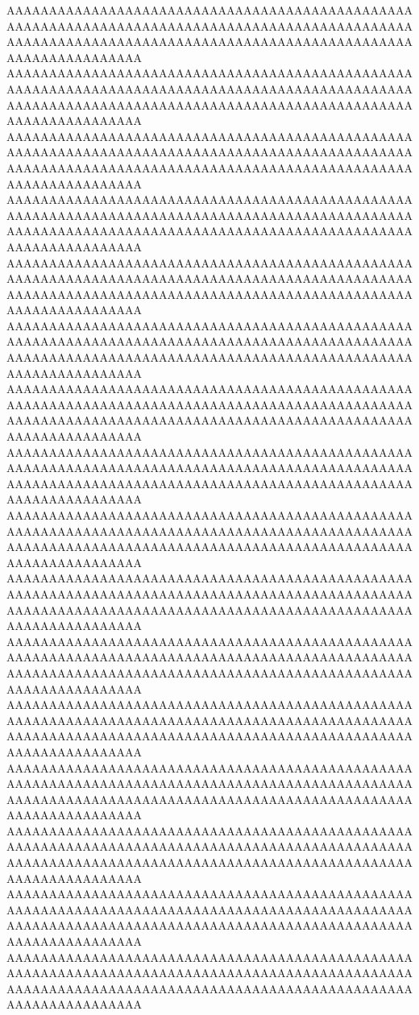 \documentclass[multi=frame]{standalone}
\begin{document}
\begin{world}
        AAAAAAAAAAAAAAAAAAAAAAAAAAAAAAAAAAAAAAAAAAAAAAAAAAAAAAAAAAAAAAAAAAAAAAAAAAAAAAAAAAAAAAAAAAAAAAAAAAAAAAAAAAAAAAAAAAAAAAAAAAAAAAAAAAAAAAAAAAAAAAAAAAAAAAAAAAAAAAAA
        AAAAAAAAAAAAAAAAAAAAAAAAAAAAAAAAAAAAAAAAAAAAAAAAAAAAAAAAAAAAAAAAAAAAAAAAAAAAAAAAAAAAAAAAAAAAAAAAAAAAAAAAAAAAAAAAAAAAAAAAAAAAAAAAAAAAAAAAAAAAAAAAAAAAAAAAAAAAAAAA
        AAAAAAAAAAAAAAAAAAAAAAAAAAAAAAAAAAAAAAAAAAAAAAAAAAAAAAAAAAAAAAAAAAAAAAAAAAAAAAAAAAAAAAAAAAAAAAAAAAAAAAAAAAAAAAAAAAAAAAAAAAAAAAAAAAAAAAAAAAAAAAAAAAAAAAAAAAAAAAAA
        AAAAAAAAAAAAAAAAAAAAAAAAAAAAAAAAAAAAAAAAAAAAAAAAAAAAAAAAAAAAAAAAAAAAAAAAAAAAAAAAAAAAAAAAAAAAAAAAAAAAAAAAAAAAAAAAAAAAAAAAAAAAAAAAAAAAAAAAAAAAAAAAAAAAAAAAAAAAAAAA
        AAAAAAAAAAAAAAAAAAAAAAAAAAAAAAAAAAAAAAAAAAAAAAAAAAAAAAAAAAAAAAAAAAAAAAAAAAAAAAAAAAAAAAAAAAAAAAAAAAAAAAAAAAAAAAAAAAAAAAAAAAAAAAAAAAAAAAAAAAAAAAAAAAAAAAAAAAAAAAAA
        AAAAAAAAAAAAAAAAAAAAAAAAAAAAAAAAAAAAAAAAAAAAAAAAAAAAAAAAAAAAAAAAAAAAAAAAAAAAAAAAAAAAAAAAAAAAAAAAAAAAAAAAAAAAAAAAAAAAAAAAAAAAAAAAAAAAAAAAAAAAAAAAAAAAAAAAAAAAAAAA
        AAAAAAAAAAAAAAAAAAAAAAAAAAAAAAAAAAAAAAAAAAAAAAAAAAAAAAAAAAAAAAAAAAAAAAAAAAAAAAAAAAAAAAAAAAAAAAAAAAAAAAAAAAAAAAAAAAAAAAAAAAAAAAAAAAAAAAAAAAAAAAAAAAAAAAAAAAAAAAAA
        AAAAAAAAAAAAAAAAAAAAAAAAAAAAAAAAAAAAAAAAAAAAAAAAAAAAAAAAAAAAAAAAAAAAAAAAAAAAAAAAAAAAAAAAAAAAAAAAAAAAAAAAAAAAAAAAAAAAAAAAAAAAAAAAAAAAAAAAAAAAAAAAAAAAAAAAAAAAAAAA
        AAAAAAAAAAAAAAAAAAAAAAAAAAAAAAAAAAAAAAAAAAAAAAAAAAAAAAAAAAAAAAAAAAAAAAAAAAAAAAAAAAAAAAAAAAAAAAAAAAAAAAAAAAAAAAAAAAAAAAAAAAAAAAAAAAAAAAAAAAAAAAAAAAAAAAAAAAAAAAAA
        AAAAAAAAAAAAAAAAAAAAAAAAAAAAAAAAAAAAAAAAAAAAAAAAAAAAAAAAAAAAAAAAAAAAAAAAAAAAAAAAAAAAAAAAAAAAAAAAAAAAAAAAAAAAAAAAAAAAAAAAAAAAAAAAAAAAAAAAAAAAAAAAAAAAAAAAAAAAAAAA
        AAAAAAAAAAAAAAAAAAAAAAAAAAAAAAAAAAAAAAAAAAAAAAAAAAAAAAAAAAAAAAAAAAAAAAAAAAAAAAAAAAAAAAAAAAAAAAAAAAAAAAAAAAAAAAAAAAAAAAAAAAAAAAAAAAAAAAAAAAAAAAAAAAAAAAAAAAAAAAAA
        AAAAAAAAAAAAAAAAAAAAAAAAAAAAAAAAAAAAAAAAAAAAAAAAAAAAAAAAAAAAAAAAAAAAAAAAAAAAAAAAAAAAAAAAAAAAAAAAAAAAAAAAAAAAAAAAAAAAAAAAAAAAAAAAAAAAAAAAAAAAAAAAAAAAAAAAAAAAAAAA
        AAAAAAAAAAAAAAAAAAAAAAAAAAAAAAAAAAAAAAAAAAAAAAAAAAAAAAAAAAAAAAAAAAAAAAAAAAAAAAAAAAAAAAAAAAAAAAAAAAAAAAAAAAAAAAAAAAAAAAAAAAAAAAAAAAAAAAAAAAAAAAAAAAAAAAAAAAAAAAAA
        AAAAAAAAAAAAAAAAAAAAAAAAAAAAAAAAAAAAAAAAAAAAAAAAAAAAAAAAAAAAAAAAAAAAAAAAAAAAAAAAAAAAAAAAAAAAAAAAAAAAAAAAAAAAAAAAAAAAAAAAAAAAAAAAAAAAAAAAAAAAAAAAAAAAAAAAAAAAAAAA
        AAAAAAAAAAAAAAAAAAAAAAAAAAAAAAAAAAAAAAAAAAAAAAAAAAAAAAAAAAAAAAAAAAAAAAAAAAAAAAAAAAAAAAAAAAAAAAAAAAAAAAAAAAAAAAAAAAAAAAAAAAAAAAAAAAAAAAAAAAAAAAAAAAAAAAAAAAAAAAAA
        AAAAAAAAAAAAAAAAAAAAAAAAAAAAAAAAAAAAAAAAAAAAAAAAAAAAAAAAAAAAAAAAAAAAAAAAAAAAAAAAAAAAAAAAAAAAAAAAAAAAAAAAAAAAAAAAAAAAAAAAAAAAAAAAAAAAAAAAAAAAAAAAAAAAAAAAAAAAAAAA

\end{world}
\end{document}
